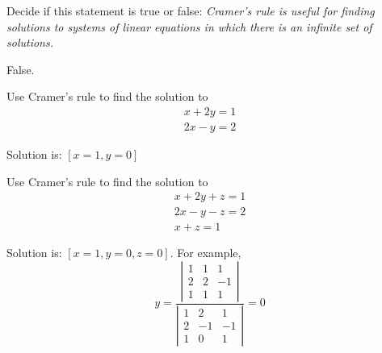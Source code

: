 \begin{enumialphparenastyle}

\begin{ex}Decide if this statement is true or false: \textit{Cramer's rule is useful for finding solutions to systems of linear
equations in which there is an infinite set of solutions.} 
\begin{sol}
False.
\end{sol}
\end{ex}

\begin{ex} Use Cramer's rule to find the solution to 
\begin{equation*}
\begin{array}{c}
x+2y=1 \\
2x-y=2
\end{array}
\end{equation*}
\begin{sol}
Solution is: $\left[ x=1,y=0\right] $
\end{sol}
\end{ex}

\begin{ex} Use Cramer's rule to find the solution to 
\begin{equation*}
\begin{array}{c}
x+2y+z=1 \\
2x-y-z=2 \\
x+z=1
\end{array}
\end{equation*}
\begin{sol}
Solution is: $\left[ x=1,y=0,z=0\right] .$ For example,
\[
y=\frac{\left\vert
\begin{array}{rrr}
1 & 1 & 1 \\
2 & 2 & -1 \\
1 & 1 & 1
\end{array}
\right\vert }{\left\vert
\begin{array}{rrr}
1 & 2 & 1 \\
2 & -1 & -1 \\
1 & 0 & 1
\end{array}
\right\vert }=0
\]
\end{sol}
\end{ex}

\end{enumialphparenastyle}